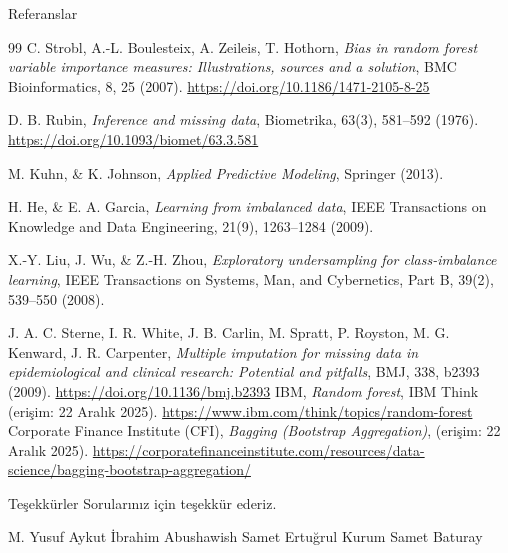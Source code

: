 \documentclass[aspectratio=169]{beamer}
\def\textbf#1{#1}%
\begin{document}
\begin{frame}[allowframebreaks]{Referanslar}
\begin{thebibliography}{99}
		C. Strobl, A.-L. Boulesteix, A. Zeileis, T. Hothorn,
		\emph{Bias in random forest variable importance measures: Illustrations, sources and a solution},
		BMC Bioinformatics, 8, 25 (2007).
		\url{https://doi.org/10.1186/1471-2105-8-25}

		D. B. Rubin,
		\emph{Inference and missing data},
		Biometrika, 63(3), 581--592 (1976).
		\url{https://doi.org/10.1093/biomet/63.3.581}

		M. Kuhn, \& K. Johnson,
		\emph{Applied Predictive Modeling},
		Springer (2013).

		H. He, \& E. A. Garcia,
		\emph{Learning from imbalanced data},
		IEEE Transactions on Knowledge and Data Engineering, 21(9), 1263--1284 (2009).

		X.-Y. Liu, J. Wu, \& Z.-H. Zhou,
		\emph{Exploratory undersampling for class-imbalance learning},
		IEEE Transactions on Systems, Man, and Cybernetics, Part B, 39(2), 539--550 (2008).

		J. A. C. Sterne, I. R. White, J. B. Carlin, M. Spratt, P. Royston, M. G. Kenward, J. R. Carpenter,
		\emph{Multiple imputation for missing data in epidemiological and clinical research: Potential and pitfalls},
		BMJ, 338, b2393 (2009).
		\url{https://doi.org/10.1136/bmj.b2393}
		IBM,
		\emph{Random forest},
		IBM Think (erişim: 22 Aralık 2025).
		\url{https://www.ibm.com/think/topics/random-forest}
		Corporate Finance Institute (CFI),
		\emph{Bagging (Bootstrap Aggregation)},
		(erişim: 22 Aralık 2025).
		\url{https://corporatefinanceinstitute.com/resources/data-science/bagging-bootstrap-aggregation/}
	\end{thebibliography}
\end{frame}

\begin{frame}{Teşekkürler}
	\centering
	\Huge{Sorularınız için teşekkür ederiz.}

	\vfill
	\footnotesize
	\textbf{M. Yusuf Aykut \quad İbrahim Abushawish \quad Samet Ertuğrul Kurum \quad Samet Baturay}
\end{frame}
\end{document}
